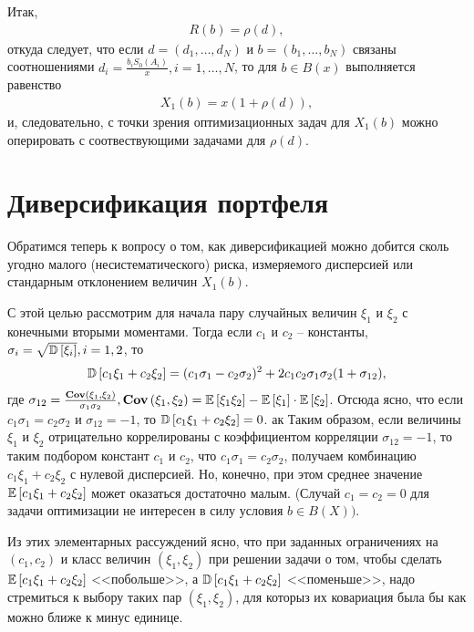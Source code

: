 Итак,
\begin{align}
R(b) = \rho(d),
\end{align}
откуда следует, что если $d = (d_1, \dots, d_N)$ и $b = (b_1, \dots, b_N)$ связаны соотношениями 
$d_i = \frac{b_i S_0(A_i)}{x}, i=1, \dots, N$, то для $b \in B(x)$ выполняется равенство
\begin{align}
X_1(b) = x(1 + \rho(d)),
\end{align}
и, следовательно, с точки зрения оптимизационных задач для $X_1(b)$ можно оперировать с соотвествующими задачами
для $\rho(d)$.

\section{Диверсификация портфеля}

Обратимся теперь к вопросу о том, как диверсификацией можно добится сколь угодно малого (несистематического) риска, измеряемого дисперсией
или стандарным отклонением величин $X_1(b)$.

С этой целью рассмотрим для начала пару случайных величин $\xi_1$ и $\xi_2$ с конечными вторыми моментами. Тогда если $c_1$ и $c_2$ -- константы,
$\sigma_i = \sqrt{\mathbb{D}\left[\xi_i\right]}, i=1,2$, то 
\begin{align}
\mathbb{D}\left[c_1 \xi_1 + c_2 \xi_2\right] = 
	(c_1 \sigma_1 - c_2 \sigma_2)^2 + 2 c_1 c_2 \sigma_1 \sigma_2 (1 + \sigma_{12}),
\end{align}
где $\sigma_{12} = \frac{\textbf{Cov}\left(\xi_1, \xi_2\right)}{\sigma_1 \sigma_2}, \textbf{Cov}\left(\xi_1, \xi_2\right) = \mathbb{E}\left[\xi_1 \xi_2\right] - \mathbb{E}\left[\xi_1\right] \cdot \mathbb{E}\left[\xi_2\right]$.
Отсюда ясно, что если $c_1 \sigma_1 = c_2 \sigma_2$ и $\sigma_{12} = -1$, то $\mathbb{D}\left[c_1 \xi_1 + c_2 \xi_2\right] = 0$.
ак
Таким образом, если величины $\xi_1$ и $\xi_2$ отрицательно коррелированы с коэффициентом корреляции $\sigma_{12} = -1$, то таким подбором
констант $c_1$ и $c_2$, что $c_1 \sigma_1 = c_2 \sigma_2$, получаем комбинацию $c_1 \xi_1 + c_2 \xi_2$ с нулевой дисперсией. Но,
конечно, при этом среднее значение $\mathbb{E}\left[c_1 \xi_1 + c_2 \xi_2\right]$ может оказаться достаточно малым. (Случай $c_1 = c_2 = 0$ для задачи 
оптимизации не интересен в силу условия $b \in B(X))$.

Из этих элементарных рассуждений ясно, что при заданных ограничениях на $(c_1, c_2)$ и класс величин $(\xi_1, \xi_2)$ при решении задачи о том,
чтобы сделать $\mathbb{E}\left[c_1 \xi_1 + c_2 \xi_2\right]$ <<побольше>>, а $\mathbb{D}\left[c_1 \xi_1 + c_2 \xi_2\right]$ <<поменьше>>, надо стремиться к выбору таких пар 
$(\xi_1, \xi_2)$, для которыз их ковариация была бы как можно ближе к минус единице.

